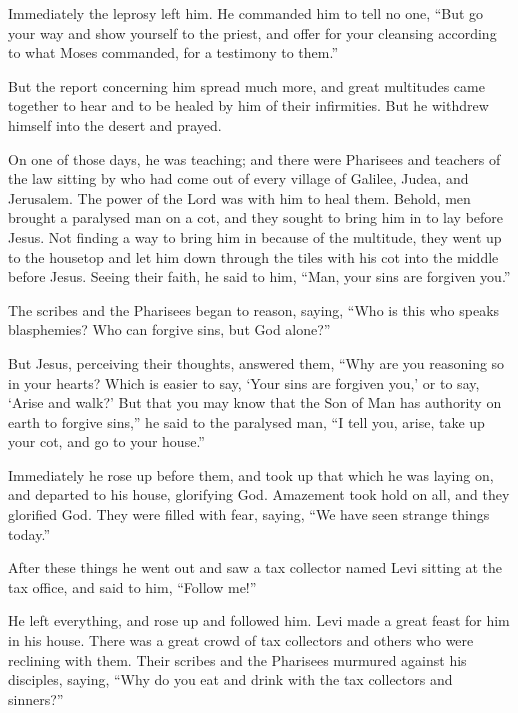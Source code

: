 Immediately the leprosy left him.  He commanded him to tell
no one, ``But go your way and show yourself to the priest, and offer for
your cleansing according to what Moses commanded, for a testimony to
them.''

 But the report concerning him spread much more, and great
multitudes came together to hear and to be healed by him of their
infirmities.  But he withdrew himself into the desert and
prayed.

 On one of those days, he was teaching; and there were
Pharisees and teachers of the law sitting by who had come out of every
village of Galilee, Judea, and Jerusalem. The power of the Lord was with
him to heal them.  Behold, men brought a paralysed man on a
cot, and they sought to bring him in to lay before Jesus. 
Not finding a way to bring him in because of the multitude, they went up
to the housetop and let him down through the tiles with his cot into the
middle before Jesus.  Seeing their faith, he said to him,
``Man, your sins are forgiven you.''

 The scribes and the Pharisees began to reason, saying,
``Who is this who speaks blasphemies? Who can forgive sins, but God
alone?''

 But Jesus, perceiving their thoughts, answered them, ``Why
are you reasoning so in your hearts?  Which is easier to
say, `Your sins are forgiven you,' or to say, `Arise and walk?'
 But that you may know that the Son of Man has authority on
earth to forgive sins,'' he said to the paralysed man, ``I tell you,
arise, take up your cot, and go to your house.''

 Immediately he rose up before them, and took up that which
he was laying on, and departed to his house, glorifying God.
 Amazement took hold on all, and they glorified God. They
were filled with fear, saying, ``We have seen strange things today.''

 After these things he went out and saw a tax collector
named Levi sitting at the tax office, and said to him, ``Follow me!''

 He left everything, and rose up and followed him.
 Levi made a great feast for him in his house. There was a
great crowd of tax collectors and others who were reclining with them.
 Their scribes and the Pharisees murmured against his
disciples, saying, ``Why do you eat and drink with the tax collectors
and sinners?''

